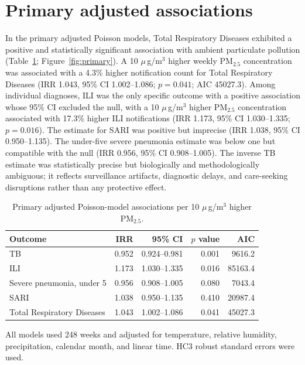 \documentclass[12pt,a4paper]{report}
\newcommand{\pmfive}{PM$_{2.5}$}
\newcommand{\ugm}{\ensuremath{\mu}\,g/m$^3$}
\begin{document}
\section{Primary adjusted associations}
In the primary adjusted Poisson models, Total Respiratory Diseases exhibited a positive and statistically significant association with ambient particulate pollution (Table~\ref{tab:primary}; Figure~\ref{fig:primary}). A 10 \ugm{} higher weekly \pmfive{} concentration was associated with a 4.3\% higher notification count for Total Respiratory Diseases (IRR 1.043, 95\% CI 1.002--1.086; $p=0.041$; AIC 45027.3). Among individual diagnoses, ILI was the only specific outcome with a positive association whose 95\% CI excluded the null, with a 10 \ugm{} higher \pmfive{} concentration associated with 17.3\% higher ILI notifications (IRR 1.173, 95\% CI 1.030--1.335; $p=0.016$). The estimate for SARI was positive but imprecise (IRR 1.038, 95\% CI 0.950--1.135). The under-five severe pneumonia estimate was below one but compatible with the null (IRR 0.956, 95\% CI 0.908--1.005). The inverse TB estimate was statistically precise but biologically and methodologically ambiguous; it reflects surveillance artifacts, diagnostic delays, and care-seeking disruptions rather than any protective effect.

\begin{table}[htbp]
\centering
\caption{Primary adjusted Poisson-model associations per 10 \ugm{} higher \pmfive{}.}
\label{tab:primary}
\begin{tabular}{lrrrr}
\toprule
Outcome & IRR & 95\% CI & $p$ value & AIC \\
\midrule
TB & 0.952 & 0.924--0.981 & 0.001 & 9616.2 \\
ILI & 1.173 & 1.030--1.335 & 0.016 & 85163.4 \\
Severe pneumonia, under 5 & 0.956 & 0.908--1.005 & 0.080 & 7043.4 \\
SARI & 1.038 & 0.950--1.135 & 0.410 & 20987.4 \\
Total Respiratory Diseases & 1.043 & 1.002--1.086 & 0.041 & 45027.3 \\
\bottomrule
\end{tabular}
\begin{flushleft}\footnotesize
All models used 248 weeks and adjusted for temperature, relative humidity, precipitation, calendar month, and linear time. HC3 robust standard errors were used.
\end{flushleft}
\end{table}
\end{document}
